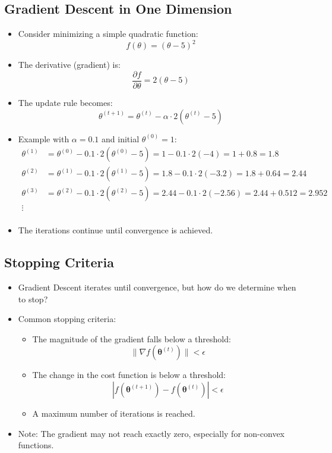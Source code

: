 \documentclass{article}
\begin{document}
\subsection{Gradient Descent in One Dimension}

\begin{itemize}
    \item Consider minimizing a simple quadratic function:
    \[
    f(\theta) = (\theta - 5)^2
    \]
    \item The derivative (gradient) is:
    \[
    \frac{\partial f}{\partial \theta} = 2(\theta - 5)
    \]
    \item The update rule becomes:
    \[
    \theta^{(t+1)} = \theta^{(t)} - \alpha \cdot 2(\theta^{(t)} - 5)
    \]
    \item Example with $\alpha = 0.1$ and initial $\theta^{(0)} = 1$:
    \begin{align*}
        \theta^{(1)} &= \theta^{(0)} - 0.1 \cdot 2(\theta^{(0)} - 5) = 1 - 0.1 \cdot 2(-4) = 1 + 0.8 = 1.8 \\
        \theta^{(2)} &= \theta^{(1)} - 0.1 \cdot 2(\theta^{(1)} - 5) = 1.8 - 0.1 \cdot 2(-3.2) = 1.8 + 0.64 = 2.44 \\
        \theta^{(3)} &= \theta^{(2)} - 0.1 \cdot 2(\theta^{(2)} - 5) = 2.44 - 0.1 \cdot 2(-2.56) = 2.44 + 0.512 = 2.952 \\
        \vdots \\
    \end{align*}
    \item The iterations continue until convergence is achieved.
\end{itemize}

\subsection{Stopping Criteria}

\begin{itemize}
    \item Gradient Descent iterates until convergence, but how do we determine when to stop?
    \item Common stopping criteria:
    \begin{itemize}
        \item The magnitude of the gradient falls below a threshold:
        \[
        \| \nabla f(\boldsymbol{\theta}^{(t)}) \| < \epsilon
        \]
        \item The change in the cost function is below a threshold:
        \[
        | f(\boldsymbol{\theta}^{(t+1)}) - f(\boldsymbol{\theta}^{(t)}) | < \epsilon
        \]
        \item A maximum number of iterations is reached.
    \end{itemize}
    \item Note: The gradient may not reach exactly zero, especially for non-convex functions.
\end{itemize}
\end{document}
